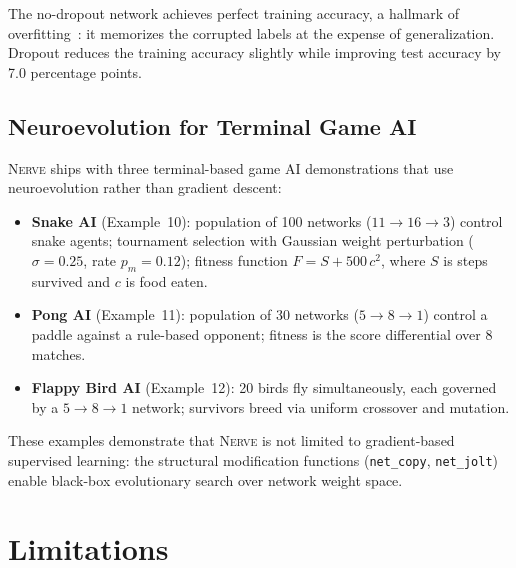 \documentclass[11pt,a4paper]{article}
\newcommand{\nerve}{\textsc{Nerve}}
\begin{document}
The no-dropout network achieves perfect training accuracy, a hallmark of
overfitting~\cite{srivastava2014}: it memorizes the corrupted labels
at the expense of generalization. Dropout reduces the training accuracy
slightly while improving test accuracy by 7.0 percentage points.

\subsection{Neuroevolution for Terminal Game AI}

\nerve{} ships with three terminal-based game AI demonstrations that use
neuroevolution rather than gradient descent:

\begin{itemize}[leftmargin=2.4em]
  \item \textbf{Snake AI} (Example~10): population of 100 networks
    ($11\to16\to3$) control snake agents; tournament selection with Gaussian
    weight perturbation ($\sigma=0.25$, rate $p_m=0.12$); fitness function
    $F = S + 500\,c^2$, where $S$ is steps survived and $c$ is food eaten.
  \item \textbf{Pong AI} (Example~11): population of 30 networks
    ($5\to8\to1$) control a paddle against a rule-based opponent; fitness is
    the score differential over 8 matches.
  \item \textbf{Flappy Bird AI} (Example~12): 20 birds fly simultaneously,
    each governed by a $5\to8\to1$ network; survivors breed via uniform
    crossover and mutation.
\end{itemize}

These examples demonstrate that \nerve{} is not limited to gradient-based
supervised learning: the structural modification functions
(\texttt{net\_copy}, \texttt{net\_jolt}) enable black-box evolutionary
search over network weight space.

\section{Limitations}
\label{sec:limits}
\end{document}
